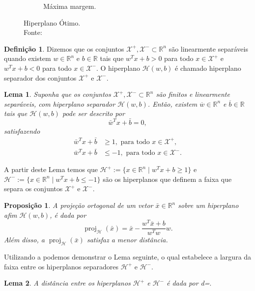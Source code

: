 \documentclass[12pt]{beamer}
\DeclareMathOperator{\proj}{proj}
\def\Xset{\mathcal{X}}
\def\Hset{\mathcal{H}}
\def\RR{\mathds{R}}
\def\xbar{\bar{x}}
\def\wbar{\bar{w}}
\def\bbar{\bar{b}}
\newtheorem{prop}{Proposição}
\newtheorem{lema}{Lema}
\theoremstyle{definition}%
\newtheorem{defi}{Definição}
\begin{document}
\begin{frame}
\begin{figure}[h]
\begin{subfigure}[h]{0.4\textwidth}
		\caption{Máxima margem. \label{fig3:b}}	
	\end{subfigure}
	\caption{Hiperplano Ótimo. \label{fig3}
		\\ Fonte: \textcite{Evelin2017}}
\end{figure}
\end{frame}

\begin{frame}
\begin{defi} \label{def1} Dizemos que os conjuntos $\Xset^{+}, \Xset^{-} \subset \RR^n$ são linearmente separáveis quando existem $w\in \RR^n$ e $b\in \RR$  tais que $w^{T}x+b>0$ para todo $x\in \Xset^{+}$ e $w^{T}x+b<0$ para todo $x\in \Xset^{-}$. O hiperplano $\Hset(w,b)$ é chamado hiperplano separador dos conjuntos $\Xset^{+}$ e $\Xset^{-}$.
\end{defi}

\begin{lema} Suponha que os conjuntos $\Xset^{+}, \Xset^{-} \subset \RR^n$ são finitos e linearmente separáveis, com hiperplano separador $\Hset(w,b)$. Então, existem $\overline{w}\in \RR^n$ e $\overline{b}\in \RR$ tais que $\Hset(w,b)$ pode ser descrito por
	\[
	\wbar^{T}x+\bbar =0,
	\]
	satisfazendo
	\begin{align}
	\wbar^{T}x+\bbar &\geq 1, \text{ para todo } x\in \Xset^{+}, \label{eq1} \\
	\wbar^{T}x+\bbar &\leq -1, \text{ para todo } x\in \Xset^{-}. \label{eq2}
	\end{align}
\end{lema} 
\end{frame}


\begin{frame}
A partir deste Lema temos que $\Hset^{+}:=\{x\in \RR^n \mid w^{T}x+b\geq 1\}$ e $\Hset^{-}:=\{x\in \RR^n \mid w^{T}x+b\leq -1\}$ são os hiperplanos que definem a faixa que separa os conjuntos $\Xset^{+}$ e $\Xset^{-}$.

\begin{prop} \label{prop1} A projeção ortogonal de um vetor $\xbar\in \RR^n$ sobre um hiperplano afim $\Hset(w,b)$, é dada por
	\[ \proj_{\Hset}(\xbar)= \xbar - \dfrac{w^{T}\xbar+b}{w^{T}w}w. \]
	Além disso, a $\proj_{\Hset}(\xbar)$ satisfaz a menor distância.
\end{prop}
\end{frame}


\begin{frame}
Utilizando a  podemos demonstrar o Lema seguinte, o qual estabelece a largura da faixa entre os hiperplanos separadores $\Hset^{+}$ e $\Hset^{-}$.

\begin{lema} A distância entre os hiperplanos $\Hset^{+}$ e $\Hset^{-}$ é dada por d=$.$
\end{lema}
\end{frame}
\end{document}
